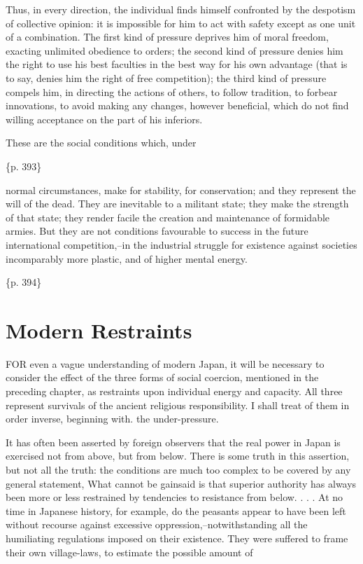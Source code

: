 Thus, in every direction, the individual finds himself confronted by the despotism of collective opinion: it is impossible for him to act with safety except as one unit of a combination. The first kind of pressure deprives him of moral freedom, exacting unlimited obedience to orders; the second kind of pressure denies him the right to use his best faculties in the best way for his own advantage (that is to say, denies him the right of free competition); the third kind of pressure compels him, in directing the actions of others, to follow tradition, to forbear innovations, to avoid making any changes, however beneficial, which do not find willing acceptance on the part of his inferiors.

These are the social conditions which, under

\{p. 393\}

normal circumstances, make for stability, for conservation; and they represent the will of the dead. They are inevitable to a militant state; they make the strength of that state; they render facile the creation and maintenance of formidable armies. But they are not conditions favourable to success in the future international competition,--in the industrial struggle for existence against societies incomparably more plastic, and of higher mental energy.

\{p. 394\}

\section{Modern Restraints}
\label{sec:org9c0c522}

FOR even a vague understanding of modern Japan, it will be necessary to consider the effect of the three forms of social coercion, mentioned in the preceding chapter, as restraints upon individual energy and capacity. All three represent survivals of the ancient religious responsibility. I shall treat of them in order inverse, beginning with. the under-pressure.



It has often been asserted by foreign observers that the real power in Japan is exercised not from above, but from below. There is some truth in this assertion, but not all the truth: the conditions are much too complex to be covered by any general statement, What cannot be gainsaid is that superior authority has always been more or less restrained by tendencies to resistance from below. . . . At no time in Japanese history, for example, do the peasants appear to have been left without recourse against excessive oppression,--notwithstanding all the humiliating regulations imposed on their existence. They were suffered to frame their own village-laws, to estimate the possible amount of

